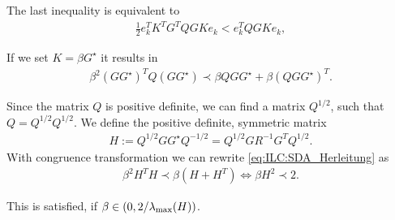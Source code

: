 The last inequality is equivalent to 
\begin{align}
\frac{1}{2}e_k^T K^T G^T Q GK e_k < e_k^T Q GK e_k, 
\end{align}

If we set $K = \beta G^{\star}$ it results in 
\begin{align}
\label{eq:ILC:SDA_Herleitung}
\beta^2 (G G^{\star})^T Q (G G^{\star}) \prec \beta Q G G^{\star} + \beta (Q G G^{\star})^T.
\end{align}

Since the matrix $Q$ is positive definite, we can find a matrix $Q^{1/2}$, such that $Q = Q^{1/2}Q^{1/2}$. We define the positive definite, symmetric matrix
\begin{align}
H:= Q^{1/2} G G^{\star} Q^{-1/2} = Q^{1/2} G R^{-1}G^T Q^{1/2}. 
\end{align}
With congruence transformation we can rewrite \eqref{eq:ILC:SDA_Herleitung} as 
\begin{align}
\beta^2 H^T H \prec \beta (H + H^T) \Leftrightarrow  \beta H^2 \prec 2.
\end{align}

This is satisfied, if $\beta \in (0, 2/\lambda_{\mathrm{max}}(H))$. 


%
%
%


